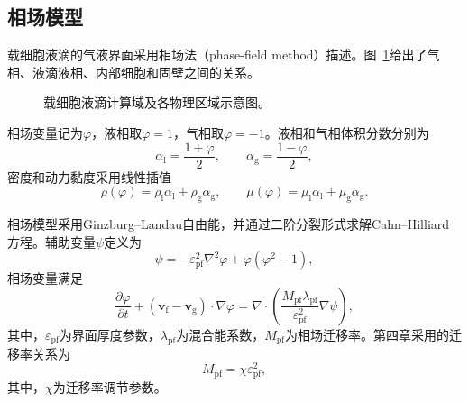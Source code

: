 \subsection{相场模型}

载细胞液滴的气液界面采用相场法（phase-field method）描述。图~\ref{fig:ch2_multiphysics_domains}给出了气相、液滴液相、内部细胞和固壁之间的关系。

\begin{figure}[htbp]
  \centering
  
  \caption{载细胞液滴计算域及各物理区域示意图。}
  \label{fig:ch2_multiphysics_domains}
\end{figure}

相场变量记为$\varphi$，液相取$\varphi=1$，气相取$\varphi=-1$。液相和气相体积分数分别为
\begin{equation}
\alpha_{\mathrm l}=\frac{1+\varphi}{2},
\qquad
\alpha_{\mathrm g}=\frac{1-\varphi}{2},
\label{eq:ch2_phase_fraction}
\end{equation}
密度和动力黏度采用线性插值
\begin{equation}
\rho(\varphi)
=
\rho_{\mathrm l}\alpha_{\mathrm l}
+
\rho_{\mathrm g}\alpha_{\mathrm g},
\qquad
\mu(\varphi)
=
\mu_{\mathrm l}\alpha_{\mathrm l}
+
\mu_{\mathrm g}\alpha_{\mathrm g}.
\label{eq:ch2_phase_properties}
\end{equation}

相场模型采用Ginzburg--Landau自由能，并通过二阶分裂形式求解Cahn--Hilliard方程。辅助变量$\psi$定义为
\begin{equation}
\psi
=
-\varepsilon_{\mathrm{pf}}^2\nabla^2\varphi
+
\varphi\left(\varphi^2-1\right),
\label{eq:ch2_phase_auxiliary}
\end{equation}
相场变量满足
\begin{equation}
\frac{\partial\varphi}{\partial t}
+
\left(\boldsymbol{v}_{\mathrm f}-\boldsymbol{v}_{\mathrm g}\right)
\cdot\nabla\varphi
=
\nabla\cdot\left(
\frac{M_{\mathrm{pf}}\lambda_{\mathrm{pf}}}
{\varepsilon_{\mathrm{pf}}^2}
\nabla\psi
\right),
\label{eq:ch2_cahn_hilliard}
\end{equation}
其中，$\varepsilon_{\mathrm{pf}}$为界面厚度参数，$\lambda_{\mathrm{pf}}$为混合能系数，$M_{\mathrm{pf}}$为相场迁移率。第四章采用的迁移率关系为
\begin{equation}
M_{\mathrm{pf}}
=
\chi\varepsilon_{\mathrm{pf}}^2,
\label{eq:ch2_phase_mobility}
\end{equation}
其中，$\chi$为迁移率调节参数\cite{anderson1998diffuseinterface,jacqmin1999phasefield,badalassi2003phasefield,yue2004diffuseinterface}。

